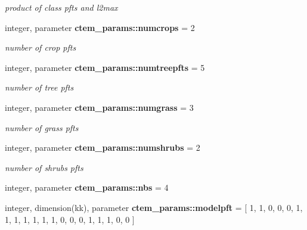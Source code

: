 \begin{DoxyCompactItemize}
\begin{DoxyCompactList}\small\item\em product of class pfts and l2max \end{DoxyCompactList}\item 
\hypertarget{namespacectem__params_a1da046f9e7bb1278e10a863dbfbda257}{}integer, parameter {\bfseries ctem\+\_\+params\+::numcrops} = 2\label{namespacectem__params_a1da046f9e7bb1278e10a863dbfbda257}

\begin{DoxyCompactList}\small\item\em number of crop pfts \end{DoxyCompactList}\item 
\hypertarget{namespacectem__params_a1bb0806116d93022aebdb7c5662a6375}{}integer, parameter {\bfseries ctem\+\_\+params\+::numtreepfts} = 5\label{namespacectem__params_a1bb0806116d93022aebdb7c5662a6375}

\begin{DoxyCompactList}\small\item\em number of tree pfts \end{DoxyCompactList}\item 
\hypertarget{namespacectem__params_aa48f481d72edc2d4d252c1fac748fabb}{}integer, parameter {\bfseries ctem\+\_\+params\+::numgrass} = 3\label{namespacectem__params_aa48f481d72edc2d4d252c1fac748fabb}

\begin{DoxyCompactList}\small\item\em number of grass pfts \end{DoxyCompactList}\item 
\hypertarget{namespacectem__params_a850eefc04333d2fa8736f5d43754b79f}{}integer, parameter {\bfseries ctem\+\_\+params\+::numshrubs} = 2\label{namespacectem__params_a850eefc04333d2fa8736f5d43754b79f}

\begin{DoxyCompactList}\small\item\em number of shrubs pfts \end{DoxyCompactList}\item 
\hypertarget{namespacectem__params_a1e8ba7b501ad6afcb7260b6b4711ae86}{}integer, parameter {\bfseries ctem\+\_\+params\+::nbs} = 4\label{namespacectem__params_a1e8ba7b501ad6afcb7260b6b4711ae86}

\item 
\hypertarget{namespacectem__params_af53120baccb346b1743b085b6b254026}{}integer, dimension(kk), parameter {\bfseries ctem\+\_\+params\+::modelpft} = \mbox{[} 1, 1, 0, 0, 0, 1, 1, 1, 1, 1, 1, 1, 0, 0, 0, 1, 1, 1, 0, 0 \mbox{]}\label{namespacectem__params_af53120baccb346b1743b085b6b254026}


\end{DoxyCompactItemize}
